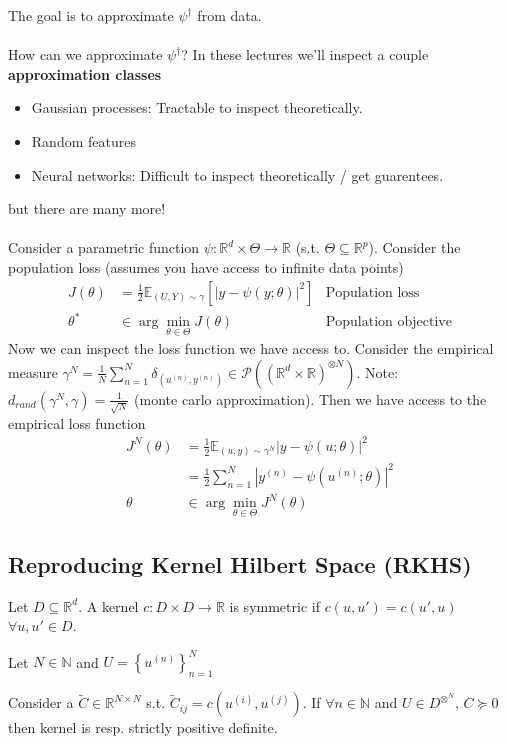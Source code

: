 \documentclass[11pt,fleqn]{article}
\numberwithin{equation}{section}
\theoremstyle{definition}
\theoremstyle{definition}
\begin{document}
The goal is to approximate $\psi^\dagger$ from data.\\
\\
How can we approximate $\psi^\dagger$? In these lectures we'll inspect a couple \textbf{approximation classes}
\begin{itemize}
	\item Gaussian processes: Tractable to inspect theoretically. 
	\item Random features
	\item Neural networks: Difficult to inspect theoretically / get guarentees.
\end{itemize}
but there are many more!\\
\\
Consider a parametric function $\psi : \mathbb R^d \times \Theta \to \mathbb R$ (s.t. $\Theta \subseteq \mathbb R^p$). Consider the population loss (assumes you have access to infinite data points)
\begin{align}
	J(\theta) & = \frac{1}{2} \mathbb E_{(U,Y) \sim \gamma} [|y - \psi(y ; \theta)|^2] & \text{Population loss}\\
	\theta^* & \in \arg \min_{\theta \in \Theta} J(\theta) & \text{Population objective}
\end{align}
Now we can inspect the loss function we have access to. Consider the empirical measure $\gamma^N = \frac{1}{N} \sum_{n=1}^N \delta_{(u^{(n)}, y^{(n)})} \in \mathcal P((\mathbb R^d \times \mathbb R)^{\otimes N})$. Note: $d_{rand} (\gamma^N, \gamma) = \frac{1}{\sqrt N}$ (monte carlo approximation). Then we have access to the empirical loss function
\begin{align}
	J^N(\theta) & = \frac{1}{2} \mathbb E_{(u,y) \sim \gamma^N} |y - \psi(u; \theta)|^2\\
	& = \frac{1}{2} \sum_{n=1}^N |y^{(n)} - \psi(u^{(n)}; \theta)|^2\\
	\theta & \in \arg \min_{\theta \in \Theta} J^N(\theta)
\end{align}

\subsection{Reproducing Kernel Hilbert Space (RKHS)}
\begin{definition}
	[Kernel] Let $D \subseteq \mathbb R^d$. A kernel $c : D \times D \to \mathbb R$ is symmetric if $c(u, u') = c(u', u)$ $\forall u, u' \in D$.
\end{definition}
Let $N \in \mathbb N$ and $U = \left\{ u^{(n)} \right\}_{n=1}^N$
\begin{definition}
	 Consider a $\tilde C \in \mathbb R^{N \times N}$ s.t. $\tilde C_{ij} = c(u^{(i)}, u^{(j)})$. If $\forall n \in \mathbb N$ and $U \in D^{\otimes^N}$, $C \succeq 0$ then kernel is resp. strictly positive definite.
\end{definition}
\end{document}
